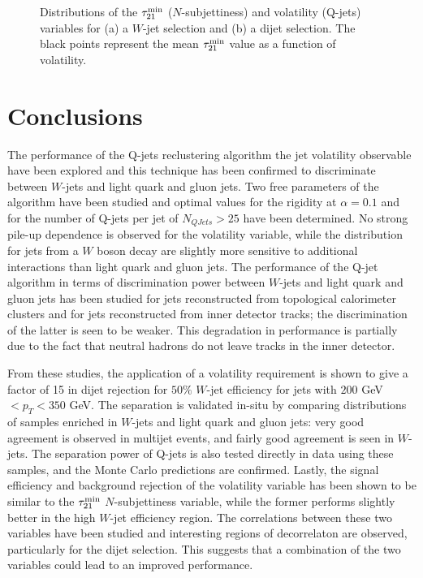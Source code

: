 \begin{figure}[htbp]
\centering
{}
\caption{Distributions of the $\tau^{\rm min}_{21}$ ($N$-subjettiness) and volatility (Q-jets) variables for (a) a $W$-jet selection and (b) a dijet selection. The black points represent the mean $\tau^{\rm min}_{21}$ value as a function of volatility.}
\label{fig:vol_vs_tau21min}
\end{figure}

\section{Conclusions}

The performance of the Q-jets reclustering algorithm the jet volatility observable have been explored and this technique has been confirmed to discriminate between $W$-jets and light quark and gluon jets. Two free parameters of the algorithm have been studied and optimal values for the rigidity at $\alpha=0.1$ and for the number of Q-jets per jet of $N_{QJets}>25$ have been determined. No strong pile-up dependence is observed for the volatility variable, while the distribution for jets from a $W$ boson decay are slightly more sensitive to additional interactions than light quark and gluon jets. The performance of the Q-jet algorithm in terms of discrimination power between $W$-jets and light quark and gluon jets has been studied for jets reconstructed from topological calorimeter clusters and for jets reconstructed from inner detector tracks; the discrimination of the latter is seen to be weaker. This degradation in performance is partially due to the fact that neutral hadrons do not leave tracks in the inner detector. 

From these studies, the application of a volatility requirement is shown to give a factor of 15 in dijet rejection for $50\%$ $W$-jet efficiency for jets with $200$ GeV $< p_T < 350$ GeV. The separation is validated in-situ by comparing distributions of samples enriched in $W$-jets and light quark and gluon jets: very good agreement is observed in multijet events, and fairly good agreement is seen in $W$-jets. The separation power of Q-jets is also tested directly in data using these samples, and the Monte Carlo predictions are confirmed. Lastly, the signal efficiency and background rejection of the volatility variable has been shown to be similar to the $\tau^{\rm min}_{21}$ $N$-subjettiness variable, while the former performs slightly better in the high $W$-jet efficiency region. The correlations between these two variables have been studied and interesting regions of decorrelaton are observed, particularly for the dijet selection. This suggests that a combination of the two variables could lead to an improved performance. 

